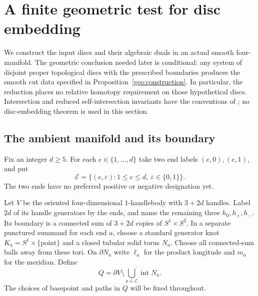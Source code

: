 \section{A finite geometric test for disc embedding}\label{sec:geometry}\label{geo:section}

We construct the input discs and their algebraic duals in an actual smooth
four-manifold.  The geometric conclusion needed later is conditional: any
system of disjoint proper topological discs with the prescribed boundaries
produces the smooth cut data specified in Proposition~\ref{geo:construction}.
In particular, the reduction places no relative homotopy requirement on
those hypothetical discs.  Intersection and reduced self-intersection
invariants have the conventions of \cite[Section~1.3]{PRT2025}; no disc-embedding
theorem is used in this section.

\subsection{The ambient manifold and its boundary}

Fix an integer $d\geq5$.  For each $e\in\{1,\ldots,d\}$ take two
end labels $(e,0),(e,1)$, and put
\[
 \mathcal E=\{(e,\varepsilon):1\leq e\leq d,
                          \ \varepsilon\in\{0,1\}\}.
\]
The two ends have no preferred positive or negative designation yet.

Let $V$ be the oriented four-dimensional $1$-handlebody with $3+2d$
handles.  Label $2d$ of its handle generators by the ends, and name the
remaining three $h_0,h_+,h_-$.  Its boundary is a connected sum of
$3+2d$ copies of $S^1\times S^2$.  In a separate punctured summand for each end $a$,
choose a standard generator knot $K_a=S^1\times\{\mathrm{point}\}$
and a closed tubular solid torus $N_a$.  Choose all connected-sum balls
away from these tori.  On $\partial N_a$ write $\ell_a$ for the
product longitude and $m_a$ for the meridian.  Define
\[
 Q=\overline{\partial V\setminus\bigcup_{a\in\mathcal E}
                                      \operatorname{int}N_a}.
\]
The choices of basepoint and paths in $Q$ will be fixed throughout.

